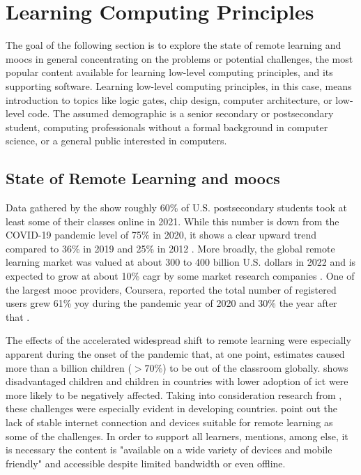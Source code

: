 \section{Learning Computing Principles}

The goal of the following section is to explore the state of remote learning and \glspl{mooc} in general concentrating on the problems or potential challenges, the most popular content available for learning low-level computing principles, and its supporting software.
Learning low-level computing principles, in this case, means introduction to topics like logic gates, chip design, computer architecture, or low-level code.
The assumed demographic is a senior secondary or postsecondary student, computing professionals without a formal background in computer science, or a general public interested in computers.

\subsection{State of Remote Learning and \glspl{mooc}}

Data gathered by the \textcite{us_doe_digest_2021} show roughly 60\% of U.S. postsecondary students took at least some of their classes online in 2021.
While this number is down from the COVID-19 pandemic level of 75\% in 2020, it shows a clear upward trend compared to 36\% in 2019 and 25\% in 2012 \parencite{us_doe_digest_2021}.
More broadly, the global remote learning market was valued at about 300 to 400 billion U.S. dollars in 2022 and is expected to grow at about 10\% \gls{cagr} by some market research companies \parencites{GlobalElearning_GIA_2023}{GlobalElearning_GMI_2023}.
One of the largest \gls{mooc} providers, Coursera, reported the total number of registered users grew 61\% \gls{yoy} during the pandemic year of 2020 and 30\% the year after that \parencite{Coursera_Impact_2021}.

The effects of the accelerated widespread shift to remote learning were especially apparent during the onset of the pandemic that, at one point, \textcite{UNESCO_2022} estimates caused more than a billion children ($>70\%$) to be out of the classroom globally.
\textcite{eu_covid_learning_2023} shows disadvantaged children and children in countries with lower adoption of \gls{ict} were more likely to be negatively affected.
Taking into consideration research from \textcite{tadesse_impact_2020}, these challenges were especially evident in developing countries.
\textcite{tadesse_impact_2020} point out the lack of stable internet connection and devices suitable for remote learning as some of the challenges.
In order to support all learners, \textcite{Ali_2020} mentions, among else, it is necessary the content is "available on a wide variety of devices and mobile friendly" and accessible despite limited bandwidth or even offline.

